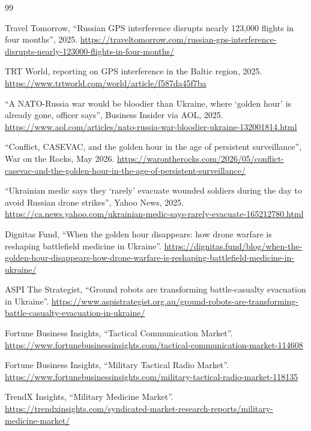 \begin{thebibliography}{99}

 Travel Tomorrow, ``Russian GPS interference disrupts nearly 123,000 flights in four months'', 2025.
\url{https://traveltomorrow.com/russian-gps-interference-disrupts-nearly-123000-flights-in-four-months/}

 TRT World, reporting on GPS interference in the Baltic region, 2025.
\url{https://www.trtworld.com/world/article/f587da45f7ba}

 ``A NATO-Russia war would be bloodier than Ukraine, where `golden hour' is already gone, officer says'',
Business Insider via AOL, 2025. \url{https://www.aol.com/articles/nato-russia-war-bloodier-ukraine-132001814.html}

 ``Conflict, CASEVAC, and the golden hour in the age of persistent surveillance'', War on the Rocks, May 2026.
\url{https://warontherocks.com/2026/05/conflict-casevac-and-the-golden-hour-in-the-age-of-persistent-surveillance/}

 ``Ukrainian medic says they `rarely' evacuate wounded soldiers during the day to avoid Russian drone strikes'',
Yahoo News, 2025. \url{https://ca.news.yahoo.com/ukrainian-medic-says-rarely-evacuate-165212780.html}

 Dignitas Fund, ``When the golden hour disappears: how drone warfare is reshaping battlefield medicine in Ukraine''.
\url{https://dignitas.fund/blog/when-the-golden-hour-disappears-how-drone-warfare-is-reshaping-battlefield-medicine-in-ukraine/}

 ASPI The Strategist, ``Ground robots are transforming battle-casualty evacuation in Ukraine''.
\url{https://www.aspistrategist.org.au/ground-robots-are-transforming-battle-casualty-evacuation-in-ukraine/}

 Fortune Business Insights, ``Tactical Communication Market''.
\url{https://www.fortunebusinessinsights.com/tactical-communication-market-114608}

 Fortune Business Insights, ``Military Tactical Radio Market''.
\url{https://www.fortunebusinessinsights.com/military-tactical-radio-market-118135}

 TrendX Insights, ``Military Medicine Market''.
\url{https://trendxinsights.com/syndicated-market-research-reports/military-medicine-market/}


\end{thebibliography}

